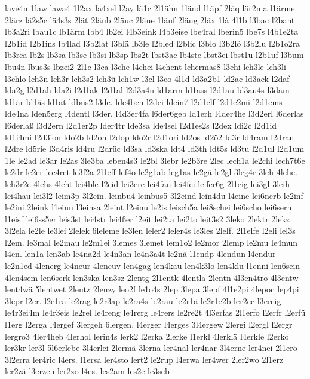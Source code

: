 {lave4n
1law
lawa4
1l2ax
la4xel
l2ay
lä1c
2l1ähn
1länd
l1äpf
2läq
lär2ma
l1ärme
2lärz
lä2s5c
lä4s3s
2lät
2läub
2läuc
2läue
1läuf
2läug
2läx
1là
4l1b
l3bac
l2bant
lb3a2ri
lbau1c
lb1ärm
lbb4
lb2ei
l4b3eink
l4b3eise
lbe4ral
lberin5
lbe7s
l4b1e2ta
l2b1id
l2b1ins
lb4lad
l3b2lat
l3blä
lb3le
l2bled
l2blic
l3blo
l3b2lö
l3b2lu
l2b1o2ra
lb3rea
lb2s
lb3sa
lb3se
lb3si
lb3sp
lbs2t
lbst3ac
lb4ste
lbst3ei
lbst1u
l2b1uf
l3bum
lbu4n
lbus3s
lbzei2
2l1c
l3ca
l3che
l4chei
l4chent
lchermas8
l3chi
lch3le
lch3li
l3chlo
lch3n
lch3r
lch3s2
lch3ü
lch1w
l3cl
l3co
4l1d
ld3a2b1
ld2ac
ld3ack
l2daf
lda2g
l2d1ah
lda2i
l2d1ak
l2d1al
l2d3a4n
ld1arm
ld1ass
l2d1au
ld3au4s
l3däm
ld1är
ld1äs
ld1ät
ldbus2
l3de.
lde4ben
l2dei
ldein7
l2d1elf
l2d1e2mi
l2d1ems
lde4na
lden5erg
l4dentl
l3der.
l4d3er4fa
l6der6geb
ld1erh
l4der4he
l3d2erl
l6derlas
l6derlaß
l3d2ern
l2d1er2p
lder4tr
lde3sa
lde4sel
l2d1es2s
l2dex
ldi2c
l2d1id
ld1i4mi
l2d3ion
ldo2b
ld2on
l2dop
ldo2r
l2d1ori
ld2os
ld2ö2
ld3r
ld4ram
l2dran
l2dre
ld5rie
l3d4ris
ld4ru
l2drüc
ld3sa
ld3ska
ldt4
ld3th
ldt5s
ld3tu
l2d1ul
l2d1um
1le
le2ad
le3ar
le2as
3le3ba
leben4s3
le2bl
3lebr
le2b3re
2lec
lech1a
le2chi
lech7t6e
le2dr
le2er
lee4ret
le3f2a
2l1eff
lef4o
le2g1ab
leg1as
le2gä
le2gl
3leg4r
3leh
4lehe.
leh3r2e
4lehs
4leht
lei4ble
l2eid
lei3ere
lei4fan
lei4fei
leifer6g
2l1eig
lei3gl
3leih
lei4hau
lei3l2
leim3p
3l2ein.
leinbu4
leinbus5
3l2eind
lein4du
l4eine
lei6nerb
le2inf
le2ini
2leink
l1einn
l3einsa
2leint
l2einu
le2is
leisch5a
lei8schei
lei6scho
lei6sern
l1eisf
lei6ss5er
leis3st
lei4str
lei4ßer
l2eit
lei2ta
lei2to
leit3s2
3leko
2lektr
2lekz
3l2ela
le2le
le3lei
2lelek
6leleme
le3len
leler2
leler4s
le3les
2lelf.
2l1elfe
l2eli
lel3s
l2em.
le3mal
le2mau
le2m1ei
3lemes
3lemet
lem1o2
le2mor
2lemp
le2mu
le4mun
l4en.
len1a
len3ab
le4na2d
le4n3an
le4n3a4t
le2nä
l1endp
4lendun
l4endur
le2n1ed
4lenerg
le4neur
4leneuv
len4gag
len4kau
len4k3lo
len4klu
l1enni
len6sein
4len4sem
len6serk
len3ska
len3sz
2lentg
2l1entk
4lentla
2lentn
4l3en4tro
4l3entw
lent4wä
5lentwet
2lentz
2lenzy
leo2f
le1o4s
2lep
3lepa
3lepf
4l1e2pi
4lepoc
lep4pi
3lepr
l2er.
l2e1ra
le2rag
le2r3ap
le2ra4s
le2rau
le2r1ä
le2r1e2b
ler2ec
l3ereig
le4r3ei4m
le4r3eis
le2rel
le4reng
le4rerg
le4rers
le2re2t
4l3erfas
2l1erfo
l2erfr
l2erfü
l1erg
l2erga
l4ergef
3lergeh
6lergen.
l4erger
l4erges
3l4ergew
2lergi
l2ergl
l2ergr
lergro3
4ler4heb
4lerhol
lerin4s
lerk2
l2erka
2lerke
l1erkl
4lerklä
l4erkle
l2erko
ler3kr
ler3l
5l6erlebe
3l4erlei
2lermä
3lerna
ler4nal
ler4nar
3l4erne
ler4nei
2l1erö
3l2erra
ler4ric
l4ers.
l1ersa
ler4sto
lert2
le2rup
l4erwa
ler4wer
2ler2wo
2l1erz
ler2zä
l3erzeu
ler2zo
l4es.
les2am
les2e
le3seb
}
